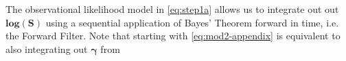 \begin{enumerate}
\begin{enumerate}
    The observational likelihood model in \eqref{eq:step1a} allows us
    to integrate out out $\boldsymbol{\mbox{log}(S)}$ using a
    sequential application of Bayes' Theorem forward in time, i.e. the
    Forward Filter. Note that starting with \eqref{eq:mod2-appendix}
    is equivalent to also integrating out $\boldsymbol{\gamma}$ from

\end{enumerate}
\end{enumerate}
